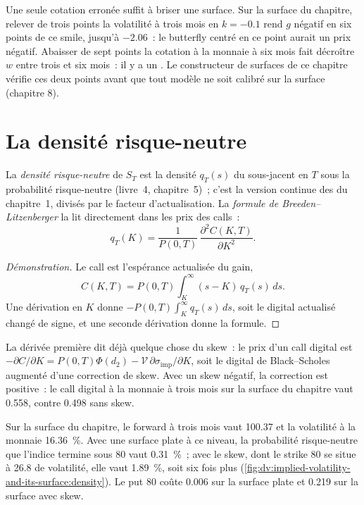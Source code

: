 Une seule cotation erronée suffit à briser une surface. Sur la surface du chapitre, relever
de trois points la volatilité à trois mois en $k=-0.1$ rend $g$ négatif en six points de ce smile,
jusqu'à $-2.06$~: le butterfly centré en ce point aurait un prix négatif. Abaisser de sept points
la cotation à la monnaie à six mois fait décroître $w$ entre trois et six mois~: il y a un . Le constructeur de surfaces de ce chapitre vérifie ces deux points avant que tout modèle ne soit
calibré sur la surface (chapitre 8).

\section{La densité risque-neutre}

\begin{definition}\label{def:dv:implied-volatility-and-its-surface:density}
La \emph{densité risque-neutre} de $S_T$ est la densité
$q_T(s)$ du sous-jacent en $T$ sous la probabilité risque-neutre (livre~4,
chapitre~5)~; c'est la version continue des  du chapitre~1, divisés par le
facteur d'actualisation. La \emph{formule de Breeden--Litzenberger}
la lit directement dans les prix des calls~:
\[
q_T(K)=\frac{1}{P(0,T)}\,\frac{\partial^2C(K,T)}{\partial K^2}.
\]
\end{definition}
\begin{proof}[Démonstration]
Le call est l'espérance actualisée du gain,
\[
C(K,T)=P(0,T)\int_K^\infty(s-K)\,q_T(s)\,ds .
\]
Une dérivation en $K$ donne $-P(0,T)\int_K^\infty q_T(s)\,ds$, soit le digital actualisé
changé de signe, et une seconde dérivation donne la formule.
\end{proof}

La dérivée première dit déjà quelque chose du skew~: le prix d'un call digital est
$-\partial C/\partial K=P(0,T)\Phi(d_2)-\mathcal V\,\partial\sigma_{\mathrm{imp}}/\partial K$,
soit le digital de Black--Scholes augmenté d'une correction de skew. Avec un skew négatif, la correction est
positive~: le call digital à la monnaie à trois mois sur la surface du chapitre vaut 0.558,
contre 0.498 sans skew.

\begin{example}\label{ex:dv:implied-volatility-and-its-surface:crash}
Sur la surface du chapitre, le forward à trois mois vaut 100.37 et la volatilité à la monnaie
16.36~\%. Avec une surface plate à ce niveau, la probabilité risque-neutre que l'indice termine
sous 80 vaut 0.31~\%~; avec le skew, dont le strike 80 se situe à 26.8 de volatilité, elle vaut 1.89~\%, soit
six fois plus (\cref{fig:dv:implied-volatility-and-its-surface:density}). Le put 80 coûte 0.006
sur la surface plate et 0.219 sur la surface avec skew.
\end{example}

